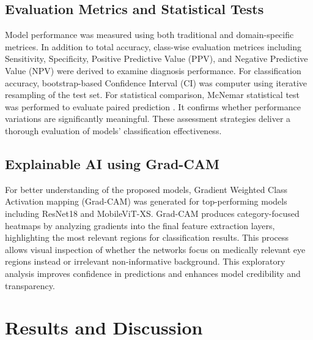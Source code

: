\documentclass[conference,9pt]{IEEEtran}
\begin{document}
\subsection{Evaluation Metrics and Statistical Tests }
       Model performance was measured using both traditional and domain-specific metrices. In addition to total accuracy, class-wise evaluation metrices including Sensitivity, Specificity, Positive Predictive Value (PPV), and Negative Predictive Value (NPV) were derived to examine diagnosis performance. For classification accuracy, bootstrap-based Confidence Interval (CI) was computer using iterative resampling of the test set. For statistical comparison, McNemar statistical test was performed to evaluate paired prediction \cite{mcnemar}. It confirms whether performance variations are significantly meaningful. These assessment strategies deliver a thorough evaluation of models’ classification effectiveness.

\subsection{Explainable AI using Grad-CAM}
For better understanding of the proposed models, Gradient Weighted Class Activation mapping (Grad-CAM) was generated for top-performing models including ResNet18 and MobileViT-XS. Grad-CAM produces category-focused heatmaps by analyzing gradients into the final feature extraction layers, highlighting the most relevant regions for classification results. This process allows visual inspection of whether the networks focus on medically relevant eye regions instead or irrelevant non-informative background. This exploratory analysis improves confidence in predictions and enhances model credibility and transparency.

\section{\textbf{Results and Discussion}}
\end{document}
